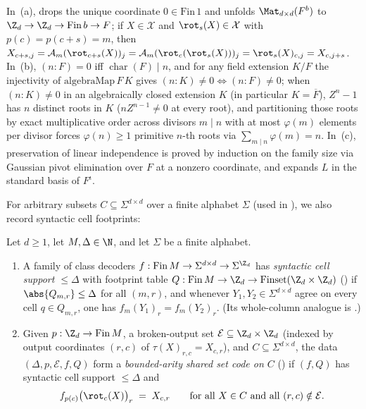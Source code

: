 \begin{outline}
In~(a),  drops the unique coordinate $0 \in \mathrm{Fin}\,1$ and
 unfolds $\Mat_{d\times d}(F^b)$ to
$\Z_d \to \Z_d \to \mathrm{Fin}\,b \to F$; if $X \in \mathcal{X}$ and $\rot_s(X) \in \mathcal{X}$ with
$p(c) = p(c + s) = m$, then
$X_{c+s, j} = \mathcal{A}_m(\rot_{c+s}(X))_j = \mathcal{A}_m(\rot_c(\rot_s(X)))_j =
\rot_s(X)_{c, j} = X_{c, j+s}$. In~(b), $(n : F) = 0$ iff $\operatorname{char}(F) \mid n$, and for
any field extension $K/F$ the injectivity of $\mathrm{algebraMap}\,F\,K$ gives
$(n : K) \ne 0 \iff (n : F) \ne 0$; when $(n : K) \ne 0$ in an algebraically closed extension $K$
(in particular $K = \overline{F}$), $Z^n - 1$ has $n$ distinct roots in $K$ ($n Z^{n-1} \ne 0$ at
every root), and partitioning those roots by exact multiplicative order across divisors $m \mid n$
with at most $\varphi(m)$ elements per divisor forces $\varphi(n) \ge 1$ primitive $n$-th roots via
$\sum_{m \mid n} \varphi(m) = n$. In~(c), preservation of linear independence is proved by induction on
the family size via Gaussian pivot elimination over $F$ at a nonzero coordinate, and
 expands $L$ in the standard basis of $F^\iota$.
\end{outline}

For arbitrary subsets $C \subseteq \Sigma^{d\times d}$ over a finite alphabet $\Sigma$ (used in
), we also record syntactic cell footprints:

\begin{definition}\label{def:bounded-arity-set-code}
Let $d \ge 1$, let $M, \Delta \in \N$, and let $\Sigma$ be a finite alphabet.
\begin{enumerate}[label=(\alph*)]
\item A family of class decoders $f : \mathrm{Fin}\,M \to \Sigma^{d\times d} \to \Sigma^{\Z_d}$ has
  \emph{syntactic cell support $\le \Delta$} with footprint table
  $Q : \mathrm{Fin}\,M \to \Z_d \to \mathrm{Finset}(\Z_d \times \Z_d)$
  () if $\abs{Q_{m,r}} \le \Delta$ for all $(m,r)$, and whenever
  $Y_1, Y_2 \in \Sigma^{d\times d}$ agree on every cell $q \in Q_{m,r}$, one has
  $f_m(Y_1)_r = f_m(Y_2)_r$. (Its whole-column analogue is .)
\item Given $p : \Z_d \to \mathrm{Fin}\,M$, a broken-output set
  $\mathcal{E} \subseteq \Z_d \times \Z_d$ (indexed by output coordinates $(r,c)$ of
  $\tau(X)_{r,c} = X_{c,r}$), and $C \subseteq \Sigma^{d\times d}$, the data
  $(\Delta, p, \mathcal{E}, f, Q)$ form a \emph{bounded-arity shared set code on $C$}
  () if $(f, Q)$ has syntactic cell support $\le \Delta$ and
  \[
    f_{p(c)}\bigl(\rot_c(X)\bigr)_r \;=\; X_{c,r}
    \qquad
    \text{for all } X \in C \text{ and all } (r,c) \notin \mathcal{E}.
  \]
\end{enumerate}
\end{definition}

